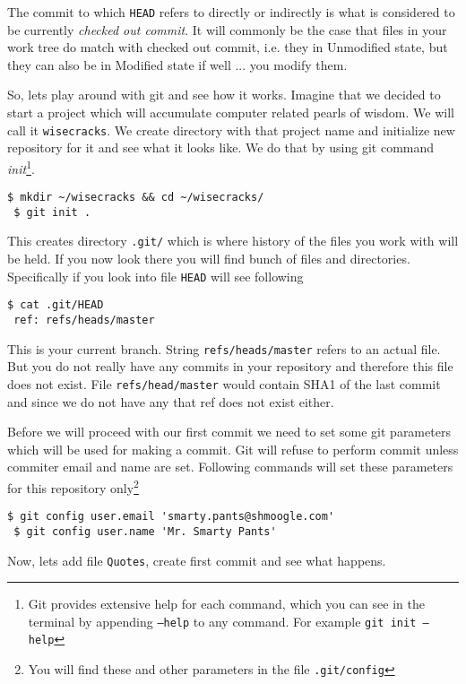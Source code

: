 \documentclass{article}
\theoremstyle{definition}
\begin{document}
        \noindent The commit to which \texttt{HEAD} refers to directly or indirectly is what is considered to be currently
        {\em checked out commit}. It will commonly be the case that files in your work tree do match with checked out
        commit, i.e. they in Unmodified state, but they can also be in Modified state if well ... you modify them.

        So, lets play around with git and see how it works. Imagine that we decided to start a project which will
        accumulate computer related pearls of wisdom. We will call it \texttt{wisecracks}. We create directory with that
        project name and initialize new repository for it and see what it looks like. We do that by using git command
        {\em init}\footnote{Git provides extensive help for each command, which you can see in the terminal by
        appending \texttt{--help} to any command. For example \texttt{git init --help}}.

        \begin{Verbatim}[frame=single]
 $ mkdir ~/wisecracks && cd ~/wisecracks/
 $ git init .
        \end{Verbatim}
        This creates directory \texttt{.git/} which is where history of the files you work with will be held. If you now
        look there you will find bunch of files and directories. Specifically if you look into file \texttt{HEAD} will
        see following

        \begin{Verbatim}[frame=single]
 $ cat .git/HEAD
 ref: refs/heads/master
        \end{Verbatim}
        This is your current branch. String \texttt{refs/heads/master} refers to an actual file. But you do not really have
        any commits in your repository and therefore this file does not exist. File \texttt{refs/head/master} would contain
        SHA1 of the last commit and since we do not have any that ref does not exist either.

        Before we will proceed with our first commit we need to set some git parameters which will be used for making a
        commit. Git will refuse to perform commit unless commiter email and name are set. Following
        commands will set these parameters for this repository only\footnote{You will find these and other parameters in
        the file \texttt{.git/config}}

        \begin{Verbatim}[frame=single]
 $ git config user.email 'smarty.pants@shmoogle.com'
 $ git config user.name 'Mr. Smarty Pants'
        \end{Verbatim}
        Now, lets add file \texttt{Quotes}, create first commit and see what happens.
\end{document}
